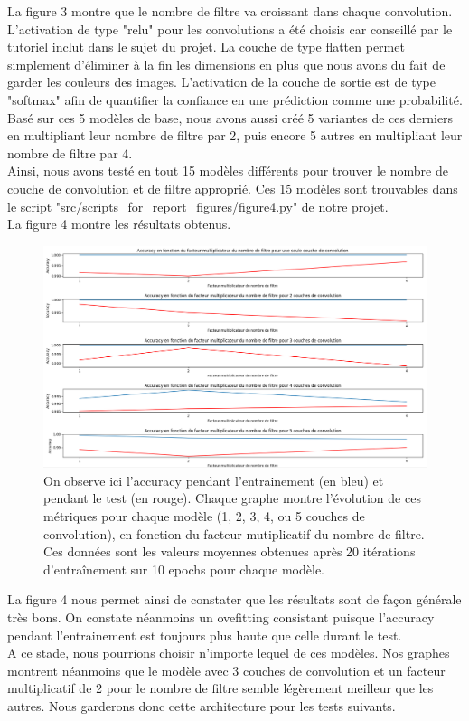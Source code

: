\documentclass{article}
\begin{document}
La figure 3 montre que le nombre de filtre va croissant dans chaque convolution. L'activation de type "relu" pour les convolutions a été choisis car conseillé par le tutoriel inclut dans le sujet du projet. La couche de type flatten permet simplement d'éliminer à la fin les dimensions en plus que nous avons du fait de garder les couleurs des images. L'activation de la couche de sortie est de type "softmax" afin de quantifier la confiance en une prédiction comme une probabilité.\\

Basé sur ces 5 modèles de base, nous avons aussi créé 5 variantes de ces derniers en multipliant leur nombre de filtre par 2, puis encore 5 autres en multipliant leur nombre de filtre par 4.\\
Ainsi, nous avons testé en tout 15 modèles différents pour trouver le nombre de couche de convolution et de filtre approprié. Ces 15 modèles sont trouvables dans le script "src/scripts\_for\_report\_figures/figure4.py" de notre projet.\\La figure 4 montre les résultats obtenus.\\
\begin{figure}[h]
\centering
\includegraphics[width=1.0\textwidth]{results_convo_test.png}
\caption{\label{fig:Input}On observe ici l'accuracy pendant l'entrainement (en bleu) et pendant le test (en rouge). Chaque graphe montre l'évolution de ces métriques pour chaque modèle (1, 2, 3, 4, ou  5 couches de convolution), en fonction du facteur mutiplicatif du nombre de filtre. Ces données sont les valeurs moyennes obtenues après 20 itérations d'entraînement sur 10 epochs pour chaque modèle.\\}
\end{figure}

La figure 4 nous permet ainsi de constater que les résultats sont de façon générale très bons. On constate néanmoins un ovefitting consistant puisque l'accuracy pendant l'entrainement est toujours plus haute que celle durant le test. \\
A ce stade, nous pourrions choisir n'importe lequel de ces modèles. Nos graphes montrent néanmoins que le modèle avec 3 couches de convolution et un facteur multiplicatif de 2 pour le nombre de filtre semble légèrement meilleur que les autres. Nous garderons donc cette architecture pour les tests suivants.
\end{document}
